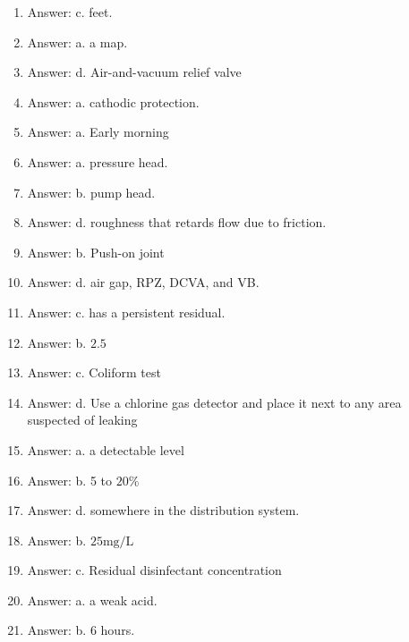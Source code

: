 \documentclass[10pt]{article}
\begin{document}
\begin{enumerate}
  \item Answer: c. feet.

  \item Answer: a. a map.

  \item Answer: d. Air-and-vacuum relief valve

  \item Answer: a. cathodic protection.

  \item Answer: a. Early morning
  
  \item Answer: a. pressure head.

  \item Answer: b. pump head.

  \item Answer: d. roughness that retards flow due to friction.

  \item Answer: b. Push-on joint
  
  \item Answer: d. air gap, RPZ, DCVA, and VB.

  \item Answer: c. has a persistent residual.

  \item Answer: b. $2.5$

  \item Answer: c. Coliform test

  \item Answer: d. Use a chlorine gas detector and place it next to any area suspected of leaking

  \item Answer: a. a detectable level

  \item Answer: b. 5 to $20 \%$

  \item Answer: d. somewhere in the distribution system.

  \item Answer: b. $25 \mathrm{mg} / \mathrm{L}$

  \item Answer: c. Residual disinfectant concentration

  \item Answer: a. a weak acid.
 
  \item Answer: b. 6 hours.


\end{enumerate}
\end{document}
